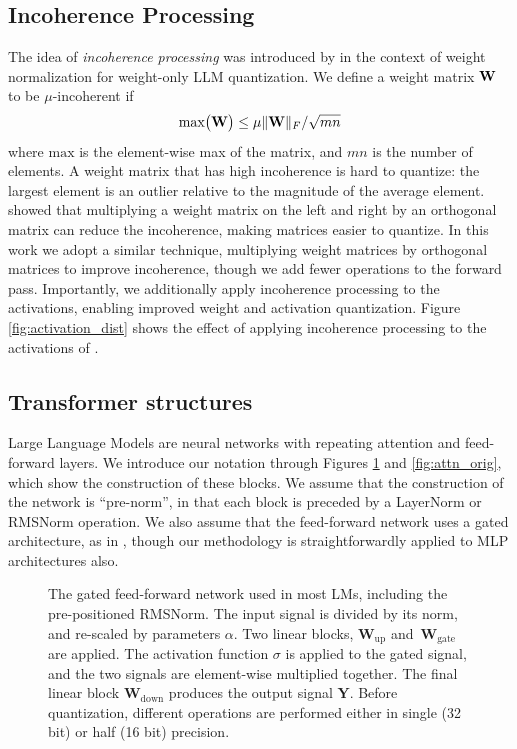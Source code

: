 \subsection{Incoherence Processing}
The idea of \emph{incoherence processing} was introduced by \citep{QuIP} in the context of weight normalization for weight-only LLM quantization. We define a weight matrix ${\mathbf{W}}$ to be $\mu$-incoherent if
\begin{equation}
\textrm{max}\big({\mathbf{W}}\big) \leq \mu \Vert {\mathbf{W}}\Vert_F / \sqrt{mn}
\end{equation}
where $\textrm{max}$ is the element-wise max of the matrix, and $mn$ is the number of elements. A weight matrix that has high incoherence is hard to quantize: the largest element is an outlier relative to the magnitude of the average element. \cite{QuIP} showed that multiplying a weight matrix on the left and right by an orthogonal matrix can reduce the incoherence, making matrices easier to quantize. In this work we adopt a similar technique, multiplying weight matrices by orthogonal matrices to improve incoherence, though we add fewer operations to the forward pass. Importantly, we additionally apply incoherence processing to the activations, enabling improved weight and activation quantization. Figure \ref{fig:activation_dist} shows the effect of applying incoherence processing to the activations of \llama. 


\subsection{Transformer structures}
Large Language Models are neural networks with repeating attention and feed-forward layers. We introduce our notation through Figures \ref{fig:ffn_orig} and \ref{fig:attn_orig}, which show the construction of these blocks. We assume that the construction of the network is ``pre-norm'', in that each block is preceded by a LayerNorm or RMSNorm operation.  We also assume that the feed-forward network uses a gated architecture, as in \llama, though our methodology is straightforwardly applied to MLP architectures also. 
%
\begin{figure}
\centering
\scalebox{0.7}{}
\caption{The gated feed-forward network used in most LMs, including the pre-positioned RMSNorm. The input signal is divided by its norm, and re-scaled by parameters $\alpha$. Two linear blocks, $\textbf{W}_\textrm{up}$ and~$\textbf{W}_\textrm{gate}$ are applied. The activation function $\sigma$ is applied to the gated signal, and the two signals are element-wise multiplied together. The final linear block $\mathbf{W}_\textrm{down}$ produces the output signal $\mathbf{Y}$. Before quantization, different operations are performed either in single (32 bit) or half (16 bit) precision.}
\label{fig:ffn_orig}
\end{figure}



